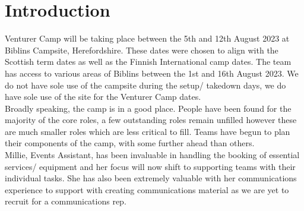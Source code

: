 \chapter{Introduction}

Venturer Camp will be taking place between the 5th and 12th August 2023 at Biblins Campsite, Herefordshire. These dates were chosen to align with the Scottish term dates as well as the Finnish International camp dates. The team has access to various areas of Biblins between the 1st and 16th August 2023. We do not have sole use of the campsite during the setup/ takedown days, we do have sole use of the site for the Venturer Camp dates.\\

Broadly speaking, the camp is in a good place. People have been found for the majority of the core roles, a few outstanding roles remain unfilled however these are much smaller roles which are less critical to fill. Teams have begun to plan their components of the camp, with some further ahead than others.\\

Millie, Events Assistant, has been invaluable in handling the booking of essential services/ equipment and her focus will now shift to supporting teams with their individual tasks. She has also been extremely valuable with her communications experience to support with creating communications material as we are yet to recruit for a communications rep.